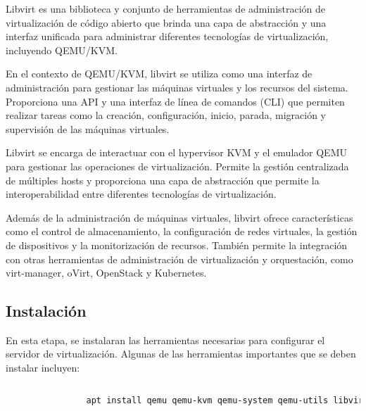 				Libvirt es una biblioteca y conjunto de herramientas de administración de virtualización de código abierto que brinda una capa de abstracción y una interfaz unificada para administrar diferentes tecnologías de virtualización, incluyendo QEMU/KVM.\par
		
				En el contexto de QEMU/KVM, libvirt se utiliza como una interfaz de administración para gestionar las máquinas virtuales y los recursos del sistema. Proporciona una API y una interfaz de línea de comandos (CLI) que permiten realizar tareas como la creación, configuración, inicio, parada, migración y supervisión de las máquinas virtuales.\par
		
				Libvirt se encarga de interactuar con el hypervisor KVM y el emulador QEMU para gestionar las operaciones de virtualización. Permite la gestión centralizada de múltiples hosts y proporciona una capa de abstracción que permite la interoperabilidad entre diferentes tecnologías de virtualización.\par
		
				Además de la administración de máquinas virtuales, libvirt ofrece características como el control de almacenamiento, la configuración de redes virtuales, la gestión de dispositivos y la monitorización de recursos. También permite la integración con otras herramientas de administración de virtualización y orquestación, como virt-manager, oVirt, OpenStack y Kubernetes.\par

				
			\subsection{Instalación}\label{instalación de las herramientas}
		
				En esta etapa, se instalaran las herramientas necesarias para configurar el servidor de virtualización. Algunas de las herramientas importantes que se deben instalar incluyen:
	
				\begin{lstlisting}[language=Bash, caption=instalación de las herramientas]
			
				apt install qemu qemu-kvm qemu-system qemu-utils libvirt-clients libvirt-daemon-system virtinst virt-manager bridge-utils		
				
				\end{lstlisting}		
			
